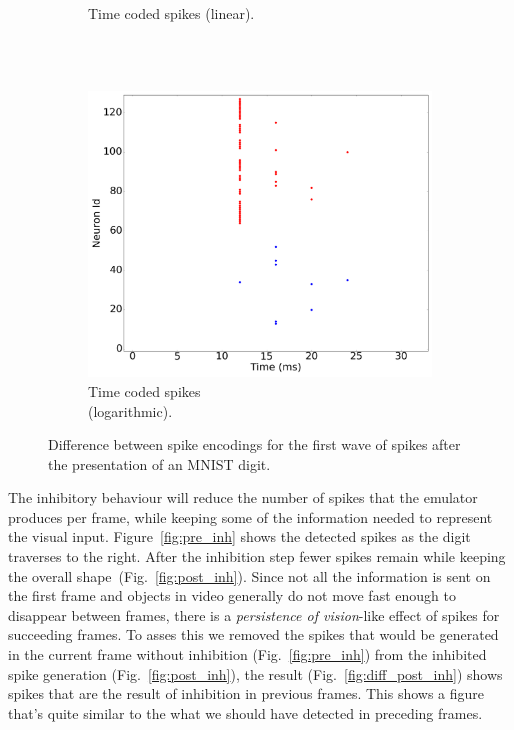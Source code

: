 \documentclass[conference]{IEEEtran}
\begin{document}
\begin{figure}[htb]
\begin{subfigure}[b]{0.3\textwidth}
    \caption{Time coded spikes (linear).\\~}
    \label{fig:time_spikes}
  \end{subfigure}~
  \begin{subfigure}[b]{0.3\textwidth}
    \includegraphics[width=\textwidth]{time_exp_coded_-8x8-_cycle_0}
    \caption{Time coded spikes \\(logarithmic).}
    \label{fig:time_exp_spikes}
  \end{subfigure}
  
  \caption{Difference between spike encodings for the first wave of spikes after the presentation of an MNIST digit.}
  \label{fig:spike_codes}
\end{figure}


The inhibitory behaviour will reduce the number of spikes that the emulator produces per frame, while keeping some of the information needed to represent the visual input. Figure~\ref{fig:pre_inh} shows the detected spikes as the digit traverses to the right. After the inhibition step fewer spikes remain while keeping the overall shape~(Fig.~\ref{fig:post_inh}). Since not all the information is sent on the first frame and objects in video generally do not move fast enough to disappear between frames, there is a \textit{persistence of vision}-like effect of spikes for succeeding frames. To asses this we removed the spikes that would be generated in the current frame without inhibition (Fig.~\ref{fig:pre_inh}) from the inhibited spike generation (Fig.~\ref{fig:post_inh}), the result (Fig.~\ref{fig:diff_post_inh}) shows spikes that are the result of inhibition in previous frames. This shows a figure that's quite similar to the what we should have detected in preceding frames.
\end{document}
